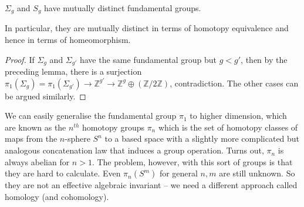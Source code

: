 \begin{corollary}
    $\Sigma_g$ and $S_g$ have mutually distinct fundamental groups.
\end{corollary}
In particular, they are mutually distinct in terms of homotopy equivalence and hence in terms of homeomorphism.
\begin{proof}
    If $\Sigma_g$ and $\Sigma_{g'}$ have the same fundamental group but $g<g'$, then by the preceding lemma, there is a surjection $\pi_1(\Sigma_g)=\pi_1(\Sigma_{g'})\to\mathbb Z^{g'}\to\mathbb Z^g\oplus(\mathbb Z/2\mathbb Z)$, contradiction.
    The other cases can be argued similarly.
\end{proof}
\begin{remark}
    We can easily generalise the fundamental group $\pi_1$ to higher dimension, which are known as the $n^{th}$ homotopy groups $\pi_n$ which is the set of homotopy classes of maps from the $n$-sphere $S^n$ to a based space with a slightly more complicated but analogous concatenation law that induces a group operation.
    Turns out, $\pi_n$ is always abelian for $n>1$.
    The problem, however, with this sort of groups is that they are hard to calculate.
    Even $\pi_n(S^m)$ for general $n,m$ are still unknown.
    So they are not an effective algebraic invariant -- we need a different approach called homology (and cohomology).
\end{remark}